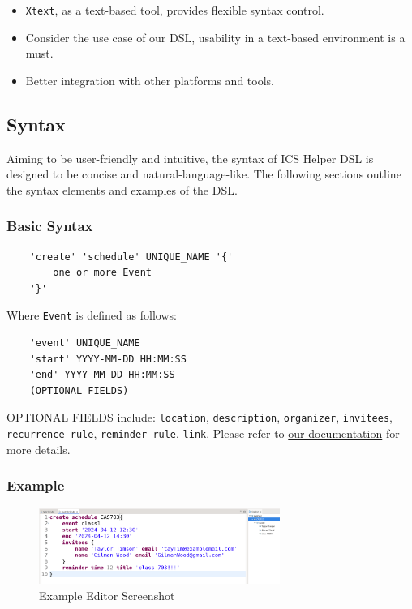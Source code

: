 \documentclass[12pt, letterpaper, twoside]{article}
\begin{document}
\begin{itemize}
    \item \texttt{Xtext}, as a text-based tool, provides flexible syntax control.
    \item Consider the use case of our DSL, usability in a text-based environment is a must.
    \item Better integration with other platforms and tools.
\end{itemize}

\subsection{Syntax}
Aiming to be user-friendly and intuitive, the syntax of ICS Helper DSL is designed to be concise and natural-language-like. 
The following sections outline the syntax elements and examples of the DSL.
\subsubsection{Basic Syntax}
\begin{verbatim}
    'create' 'schedule' UNIQUE_NAME '{'
        one or more Event
    '}'
\end{verbatim}

Where \texttt{Event} is defined as follows:

\begin{verbatim}
    'event' UNIQUE_NAME
    'start' YYYY-MM-DD HH:MM:SS
    'end' YYYY-MM-DD HH:MM:SS
    (OPTIONAL FIELDS)
\end{verbatim}
OPTIONAL FIELDS include: \texttt{location}, \texttt{description}, \texttt{organizer}, \texttt{invitees}, \texttt{recurrence rule}, \texttt{reminder rule}, \texttt{link}. 
Please refer to \href{https://github.com/Gudauu/ICS-Helper}{our documentation} for more details.

\subsubsection{Example}
\begin{figure}[H]
    \centering
    \includegraphics[width=0.7\textwidth]{editor_example.png}
    \caption{Example Editor Screenshot}
    \label{fig:class-diagram}
\end{figure}
\end{document}
